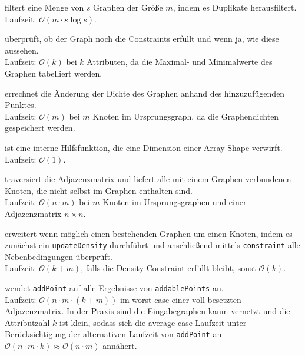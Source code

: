 \documentclass[a4paper]{scrartcl}
\begin{document}
\begin{description}[style=multiline,leftmargin=2.75cm,font=\bfseries]
 \item[filterLayer] filtert eine Menge von $s$ Graphen der Größe $m$, indem es Duplikate herausfiltert. \\ Laufzeit: $\mathcal{O}(m \cdot s \log s)$.
 \item[constraint] überprüft, ob der Graph noch die Constraints erfüllt und wenn ja, wie diese aussehen. \\ Laufzeit: $\mathcal{O}(k)$ bei $k$ Attributen, da die Maximal- und Minimalwerte des Graphen tabelliert werden.
 \item[updateDensity] errechnet die Änderung der Dichte des Graphen anhand des hinzuzufügenden Punktes. \\ Laufzeit: $\mathcal{O}(m)$ bei $m$ Knoten im Ursprungsgraph, da die Graphendichten gespeichert werden.
 \item[reduceDim] ist eine interne Hilfsfunktion, die eine Dimension einer Array-Shape verwirft. \\ Laufzeit: $\mathcal{O}(1)$.
 \item[addablePoints] traversiert die Adjazenzmatrix und liefert alle mit einem Graphen verbundenen Knoten, die nicht selbst im Graphen enthalten sind. \\ Laufzeit: $\mathcal{O}(n \cdot m)$ bei $m$ Knoten im Ursprungsgraphen und einer Adjazenzmatrix $n\times n$.
 \item[addPoint] erweitert wenn möglich einen bestehenden Graphen um einen Knoten, indem es zunächst ein \texttt{updateDensity} durchführt und anschließend mittels \texttt{constraint} alle Nebenbedingungen überprüft. \\ Laufzeit: $\mathcal{O}(k + m)$, falls die Density-Constraint erfüllt bleibt, sonst $\mathcal{O}(k)$.
 \item[expand] wendet \texttt{addPoint} auf alle Ergebnisse von \texttt{addablePoints} an.\\
 Laufzeit: $\mathcal{O}(n \cdot m \cdot (k + m))$ im worst-case einer voll besetzten Adjazenzmatrix. In der Praxis sind die Eingabegraphen kaum vernetzt und die Attributzahl $k$ ist klein, sodass sich die average-case-Laufzeit unter Berücksichtigung der alternativen Laufzeit von \texttt{addPoint} an $\mathcal{O}(n \cdot m \cdot k) \approx \mathcal{O}(n \cdot m)$ annähert.
 
\end{description}
\end{document}
